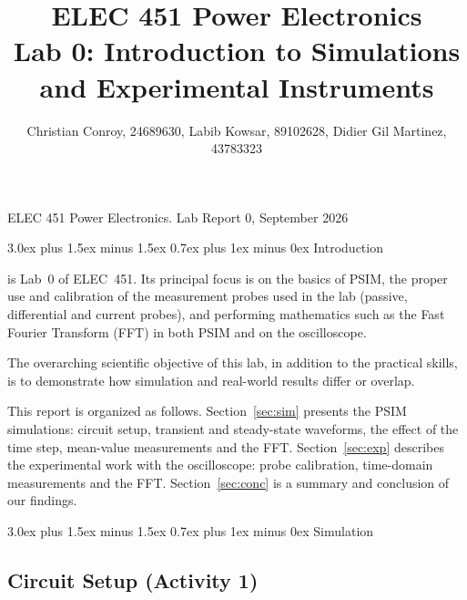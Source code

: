 \documentclass[journal,onecolumn]{IEEEtran}
\makeatletter
\renewcommand\section{\@startsection{section}{1}{\z@}%
  {3.0ex plus 1.5ex minus 1.5ex}%
  {0.7ex plus 1ex minus 0ex}%
  {\normalfont\Large\centering\scshape}}
\makeatother
\begin{document}
\title{ELEC 451 Power Electronics\\
Lab 0: Introduction to Simulations and Experimental Instruments}

\author{Christian Conroy, 24689630,
        Labib Kowsar, 89102628,
        Didier Gil Martinez, 43783323%
}

%
{ELEC 451 Power Electronics. Lab Report 0, September 2026}

\maketitle

\section{Introduction}
\label{sec:intro}

 is Lab~0 of ELEC~451. Its principal focus is on the
basics of PSIM, the proper use and calibration of the measurement probes used
in the lab (passive, differential and current probes), and performing
mathematics such as the Fast Fourier Transform (FFT) in both PSIM and on the
oscilloscope.

The overarching scientific objective of this lab, in addition to the
practical skills, is to demonstrate how simulation and real-world results
differ or overlap.

This report is organized as follows. Section~\ref{sec:sim} presents the PSIM
simulations: circuit setup, transient and steady-state waveforms, the effect
of the time step, mean-value measurements and the FFT.
Section~\ref{sec:exp} describes the experimental work with the oscilloscope:
probe calibration, time-domain measurements and the FFT.
Section~\ref{sec:conc} is a summary and conclusion of our findings.

\section{Simulation}
\label{sec:sim}

\subsection{Circuit Setup (Activity 1)}
\end{document}
